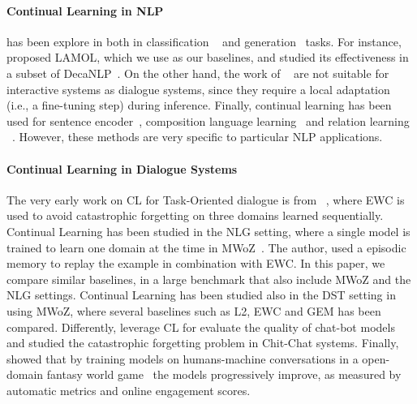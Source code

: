 \documentclass[11pt,a4paper]{article}
\begin{document}
\paragraph{Continual Learning in NLP} has been explore in both in classification ~\cite{d2019episodic,sprechmann2018memory,wang2020efficient} and generation~\cite{sun2019lamol,hu2020drinking} tasks. For instance, \citet{sun2019lamol,chuang2020lifelong} proposed LAMOL, which we use as our baselines, and studied its effectiveness in a subset of DecaNLP~\cite{mccann2018natural}. On the other hand, the work of ~\citet{d2019episodic,sprechmann2018memory} are not suitable for interactive systems as dialogue systems, since they require a local adaptation (i.e., a fine-tuning step) during inference. Finally, continual learning has been used for sentence encoder~\cite{liu2019continual}, composition language learning~\cite{li2019compositional} and relation learning ~\cite{han2020continual}. However, these methods are very specific to particular NLP applications. 

\paragraph{Continual Learning in Dialogue Systems} The very early work on CL for Task-Oriented dialogue is from ~\citet{lee2017toward}, where EWC is used to avoid catastrophic forgetting on three domains learned sequentially. Continual Learning has been studied in the NLG setting, where a single model is trained to learn one domain at the time in MWoZ~\cite{mi2020continual}. The author, used a episodic memory to replay the example in combination with EWC. In this paper, we compare similar baselines, in a large benchmark that also include MWoZ and the NLG settings. Continual Learning has been studied also in the DST setting in ~\cite{wu2019transferable} using MWoZ, where several baselines such as L2, EWC and GEM has been compared. Differently, \cite{li2019evaluate} leverage CL for evaluate the quality of chat-bot models and \citet{he2019mix} studied the catastrophic forgetting problem in Chit-Chat systems. Finally, \cite{shuster2020deploying} showed that by training models on humans-machine conversations in a open-domain fantasy world game~\cite{fan2020generating} the models progressively improve, as measured by automatic metrics and online engagement scores. 
\end{document}
